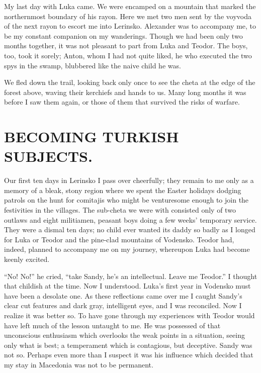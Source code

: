 \documentclass[a5paper,12pt]{book}
\begin{document}
My last day with Luka came. We were encamped on a mountain that marked the northernmost boundary of his rayon. Here we met two men sent by the voyvoda of the next rayon to escort me into Lerinsko. Alexander was to accompany me, to be my constant companion on my wanderings. Though we had been only two months together, it was not pleasant to part from Luka and Teodor. The boys, too, took it sorely; Anton, whom I had not quite liked, he who executed the two spys in the swamp, blubbered like the naive child he was.

We fled down the trail, looking back only once to see the cheta at the edge of the forest above, waving their kerchiefs and hands to us. Many long months it was before I saw them again, or those of them that survived the risks of warfare.


\chapter{BECOMING TURKISH SUBJECTS.}

Our first ten days in Lerinsko I pass over cheerfully; they remain to me only as a memory of a bleak, stony region where we spent the Easter holidays dodging patrols on the hunt for comitajis who might be venturesome enough to join the festivities in the villages. The sub-cheta we were with consisted only of two outlaws and eight militiamen, peasant boys doing a few weeks’ temporary service. They were a dismal ten days; no child ever wanted its daddy so badly as I longed for Luka or Teodor and the pine-clad mountains of Vodensko. Teodor had, indeed, planned to accompany me on my journey, whereupon Luka had become keenly excited.

“No! No!” he cried, “take Sandy, he’s an intellectual. Leave me Teodor.” I thought that childish at the time. Now I understood. Luka’s first year in Vodensko must have been a desolate one. As these reflections came over me I caught Sandy’s clear cut features and dark gray, intelligent eyes, and I was reconciled. Now I realize it was better so. To have gone through my experiences with Teodor would have left much of the lesson untaught to me. He was possessed of that unconscious enthusiasm which overlooks the weak points in a situation, seeing only what is best; a temperament which is contagious, but deceptive. Sandy was not so. Perhaps even more than I suspect it was his influence which decided that my stay in Macedonia was not to be permanent.
\end{document}
